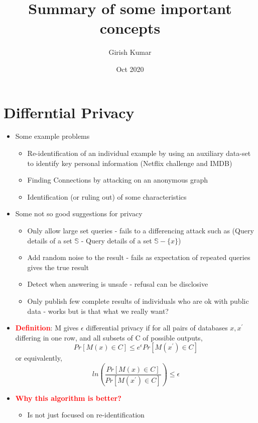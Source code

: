 \documentclass{article}
\title{Summary of some important concepts}
\author{Girish Kumar }
\date{Oct 2020}
\newcommand{\redb}[1]{\textcolor{red}{\textbf{#1}}}
\begin{document}
\maketitle

\tableofcontents
\newpage

\section{Differntial Privacy}

\begin{itemize}
    \item Some example problems
        \begin{itemize}
            \item Re-identification of an individual example by using an auxiliary data-set to identify key personal information (Netflix challenge and IMDB)
            \item Finding Connections by attacking on an anonymous graph
            \item Identification (or ruling out) of  some characteristics
        \end{itemize}
    \item Some not so good suggestions for privacy
        \begin{itemize}
            \item Only allow large set queries - fails to a differencing attack such as (Query details of a set $\mathbb{S}$ - Query details of a set $\mathbb{S}-\{x\}$)
            \item Add random noise to the result - fails as expectation of repeated queries gives the true result
            \item Detect when answering is unsafe - refusal can be disclosive
            \item Only publish few complete results of individuals who are ok with public data - works but is that what we really want?
        \end{itemize}
    \item \redb{Definition}: M gives $\epsilon$ differential privacy if for all pairs of databases $x, x^\prime$ differing in one row, and all subsets of C of possible outputs,
    $$Pr[M(x) \in C] \leq e^\epsilon Pr[M(x^\prime) \in C]$$
    or equivalently,
    $$ln\left( \frac{Pr[M(x) \in C]}{Pr[M(x^\prime) \in C]} \right) \leq \epsilon$$
    \item \redb{Why this algorithm is better?}
        \begin{itemize}
            \item Is not just focused on re-identification

\end{itemize}
\end{itemize}
\end{document}
